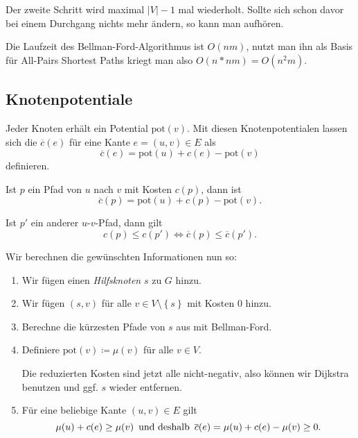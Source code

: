 Der zweite Schritt wird maximal \( \left\vert V \right\vert - 1 \) mal wiederholt. Sollte sich schon davor bei einem Durchgang nichts mehr ändern, so kann man aufhören.

Die Laufzeit des Bellman-Ford-Algorithmus ist \( O(nm) \), nutzt man ihn als Basis für All-Pairs Shortest Paths kriegt man also \( O(n * nm) = O(n^2m) \).

\subsection{Knotenpotentiale}

Jeder Knoten erhält ein Potential \( \text{pot}(v) \). Mit diesen Knotenpotentialen lassen sich die  \( \overline{c}(e) \) für eine Kante \( e = (u,v) \in E \) als
\begin{equation*}
  \overline{c}(e) = \text{pot}(u) + c(e) - \text{pot}(v)
\end{equation*}
definieren.

Ist \( p \) ein Pfad von \( u \) nach \( v \) mit Kosten \( c(p) \), dann ist
\begin{equation*}
  \overline{c}(p) = \text{pot}(u) + c(p) - \text{pot}(v)\text{.}
\end{equation*}

Ist \( p' \) ein anderer \( u \)-\( v \)-Pfad, dann gilt
\begin{equation*}
  c(p) \leq c(p') \Leftrightarrow \overline{c}(p) \leq \overline{c}(p')\text{.}
\end{equation*}

Wir berechnen die gewünschten Informationen nun so:
\begin{enumerate}
  \item Wir fügen einen \emph{Hilfsknoten} \( s \) zu \( G \) hinzu.
  \item Wir fügen \( (s,v) \) für alle \( v \in V \setminus \left \{ s \right \} \) mit Kosten \( 0 \) hinzu.
  \item Berechne die kürzesten Pfade von \( s \) aus mit Bellman-Ford.
  \item Definiere \( \text{pot}(v) \coloneqq \mu(v) \) für alle \( v \in V \).

  Die reduzierten Kosten sind jetzt alle nicht-negativ, also können wir Dijkstra benutzen und ggf. \( s \) wieder entfernen.
  \item Für eine beliebige Kante \( (u,v) \in E \) gilt
  \begin{equation*}
    \mu(u) + c(e) \geq \mu(v) \enskip \text{und deshalb} \enskip \overline{c}(e) = \mu(u) + c(e) - \mu(v) \geq 0\text{.}
  \end{equation*}
\end{enumerate}

